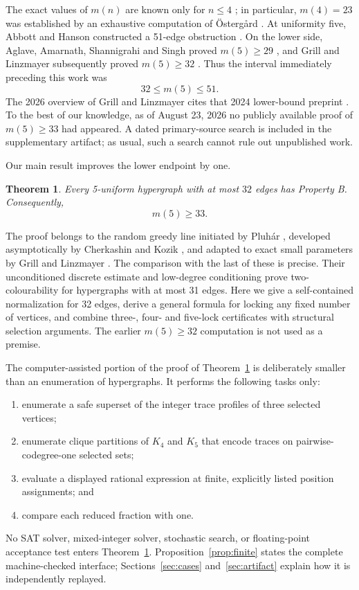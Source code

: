 \documentclass[11pt]{article}
\newtheorem{theorem}{Theorem}
\theoremstyle{remark}
\begin{document}
The exact values of $m(n)$ are known only for $n\le4$
\cite{GrillLinzmayerOverview2026}; in particular,
$m(4)=23$ was established by an exhaustive computation of
\"Osterg{\aa}rd \cite{Ostergard2014}.  At uniformity five, Abbott and Hanson
constructed a 51-edge obstruction \cite{AbbottHanson1969}.  On the lower
side, Aglave, Amarnath, Shannigrahi and Singh proved $m(5)\ge29$
\cite{AglaveEtAl2020}, and Grill and Linzmayer subsequently proved
$m(5)\ge32$ \cite{GrillLinzmayer2024}.  Thus the interval immediately
preceding this work was
\[
32\le m(5)\le51.
\]
The 2026 overview of Grill and Linzmayer cites that 2024 lower-bound preprint
\cite{GrillLinzmayerOverview2026}.  To the best of our knowledge, as
of August 23, 2026 no publicly available proof of $m(5)\ge33$ had appeared.
A dated primary-source search is included in the supplementary artifact; as
usual, such a search cannot rule out unpublished work.

Our main result improves the lower endpoint by one.

\begin{theorem}\label{thm:main}
Every 5-uniform hypergraph with at most $32$ edges has Property B.
Consequently,
\[
m(5)\ge33.
\]
\end{theorem}

The proof belongs to the random greedy line initiated by Pluh\'ar
\cite{Pluhar2009}, developed asymptotically by Cherkashin and Kozik
\cite{CherkashinKozik2015}, and adapted to exact small parameters by Grill
and Linzmayer \cite{GrillLinzmayer2024}.  The comparison with the last of
these is precise.  Their unconditioned discrete estimate and low-degree
conditioning prove two-colourability for hypergraphs with at most 31 edges.
Here we give a self-contained
normalization for 32 edges, derive a general formula for locking any fixed
number of vertices, and combine three-, four- and five-lock certificates
with structural selection arguments.  The earlier $m(5)\ge32$ computation
is not used as a premise.

The computer-assisted portion of the proof of
Theorem~\ref{thm:main} is deliberately smaller than an enumeration of
hypergraphs.  It performs the following tasks only:
\begin{enumerate}[leftmargin=2em]
\item enumerate a safe superset of the integer trace profiles of three
      selected vertices;
\item enumerate clique partitions of $K_4$ and $K_5$ that encode traces on
      pairwise-codegree-one selected sets;
\item evaluate a displayed rational expression at finite, explicitly listed
      position assignments; and
\item compare each reduced fraction with one.
\end{enumerate}
No SAT solver, mixed-integer solver, stochastic search, or floating-point
acceptance test enters Theorem~\ref{thm:main}.  Proposition~\ref{prop:finite}
states the complete machine-checked interface; Sections~\ref{sec:cases}
and~\ref{sec:artifact} explain how it is independently replayed.
\end{document}
